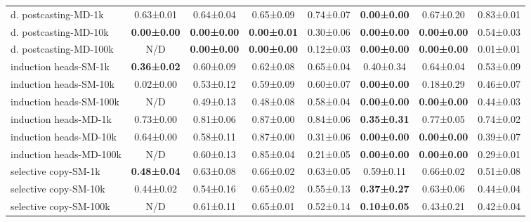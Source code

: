 \documentclass{article}
\begin{document}
\begin{table}[H]
{\begin{tabular}{lccccccc}
d. postcasting-MD-1k             & 0.63±0.01      & 0.64±0.04      & 0.65±0.09      & 0.74±0.07      & \textbf{0.00±0.00}        & 0.67±0.20           & 0.83±0.01      \\
d. postcasting-MD-10k            & \textbf{0.00±0.00}  & \textbf{0.00±0.00}  & \textbf{0.00±0.01}  & 0.30±0.06      & \textbf{0.00±0.00}        & \textbf{0.00±0.00}       & 0.54±0.03      \\
d. postcasting-MD-100k           & N/D              & \textbf{0.00±0.00}  & \textbf{0.00±0.00}  & 0.12±0.03      & \textbf{0.00±0.00}        & \textbf{0.00±0.00}       & 0.01±0.01      \\
induction heads-SM-1k                  & \textbf{0.36±0.02}  & 0.60±0.09      & 0.62±0.08      & 0.65±0.04      & 0.40±0.34            & 0.64±0.04           & 0.53±0.09      \\
induction heads-SM-10k                 & 0.02±0.00      & 0.53±0.12      & 0.59±0.09      & 0.60±0.07      & \textbf{0.00±0.00}        & 0.18±0.29           & 0.46±0.07      \\
induction heads-SM-100k                & N/D              & 0.49±0.13      & 0.48±0.08      & 0.58±0.04      & \textbf{0.00±0.00}        & \textbf{0.00±0.00}       & 0.44±0.03      \\
induction heads-MD-1k                  & 0.73±0.00      & 0.81±0.06      & 0.87±0.00      & 0.84±0.06      & \textbf{0.35±0.31}        & 0.77±0.05           & 0.74±0.02      \\
induction heads-MD-10k                 & 0.64±0.00      & 0.58±0.11      & 0.87±0.00      & 0.31±0.06      & \textbf{0.00±0.00}        & \textbf{0.00±0.00}       & 0.39±0.07      \\
induction heads-MD-100k                & N/D              & 0.60±0.13      & 0.85±0.04      & 0.21±0.05      & \textbf{0.00±0.00}        & \textbf{0.00±0.00}       & 0.29±0.01 \\
selective copy-SM-1k                   & \textbf{0.48±0.04}  & 0.63±0.08      & 0.66±0.02      & 0.63±0.05      & 0.59±0.11            & 0.66±0.02           & 0.51±0.08      \\
selective copy-SM-10k                  & 0.44±0.02      & 0.54±0.16      & 0.65±0.02      & 0.55±0.13      & \textbf{0.37±0.27}        & 0.63±0.06           & 0.44±0.04      \\
selective copy-SM-100k                 & N/D              & 0.61±0.11      & 0.65±0.01      & 0.52±0.14      & \textbf{0.10±0.05}        & 0.43±0.21           & 0.42±0.04      \\

\end{tabular}}
\end{table}
\end{document}
